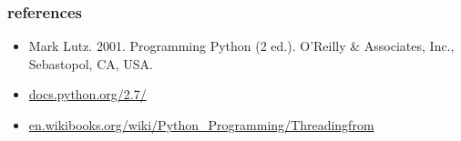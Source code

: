 \documentclass{beamer}
\begin{document}
\begin{frame}
 \frametitle{references}
 \begin{itemize}
  \item Mark Lutz. 2001. Programming Python (2 ed.). O'Reilly \& Associates, Inc., Sebastopol, CA, USA.
  \item \href{https://docs.python.org/2.7/}{docs.python.org/2.7/}
  \item \href{http://en.wikibooks.org/wiki/Python_Programming/Threadingfrom}{en.wikibooks.org/wiki/Python\_Programming/Threadingfrom}
 \end{itemize}
\end{frame}
	







%
\end{document}
